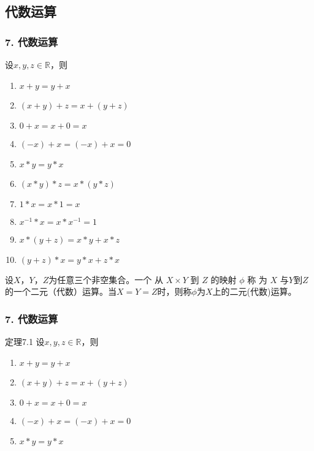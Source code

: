 \documentclass{beamer}
\begin{document}
\begin{CJK*}{UTF8}{gbsn}
 
 
\section{代数运算}
\begin{frame}
  \frametitle{7. 代数运算}
  \begin{minipage}[t]{0.5\linewidth}
  \begin{Thm}
    设$x, y, z \in \mathbb{R}$，则
   \begin{enumerate}
   \item   $x + y = y + x$
   \item   $(x + y) + z = x + (y + z)$
   \item   $0 + x = x + 0 = x$
   \item   $(-x) + x = (-x) + x = 0$
   \item   $x * y = y * x$
   \item   $(x * y) * z = x * (y *z)$
   \item   $1 * x = x * 1 = x$
   \item   $x^{-1} * x = x * x^{-1} = 1$
   \item   $x* (y + z) = x * y + x * z$
   \item   $(y + z) * x = y * x + z * x$
    \end{enumerate}
  \end{Thm}
\end{minipage}\pause
\begin{minipage}[t]{0.5\linewidth}
  \begin{Def}
    设$X$，$Y$，$Z$为任意三个非空集合。一个 从 $X\times Y$ 到 $Z$ 的映射 $\phi$ 称 为 $X$ 与$Y$到$Z$的一个\alert{二元（代数）运算}。当$X=Y=Z$时，则称$\phi$为$X$上的\alert{二元(代数)运算}。
  \end{Def}
\end{minipage}
\end{frame}
\begin{frame}
  \frametitle{7. 代数运算}
  \begin{minipage}[t]{0.49\linewidth}
  \begin{block}{定理7.1}
    设$x, y, z \in \mathbb{R}$，则
   \begin{enumerate}
   \item   $x + y = y + x$
   \item   $(x + y) + z = x + (y + z)$
   \item   $0 + x = x + 0 = x$
   \item   $(-x) + x = (-x) + x = 0$
   \item   $x * y = y * x$

\end{enumerate}
\end{block}
\end{minipage}
\end{frame}
\end{CJK*}
\end{document}
